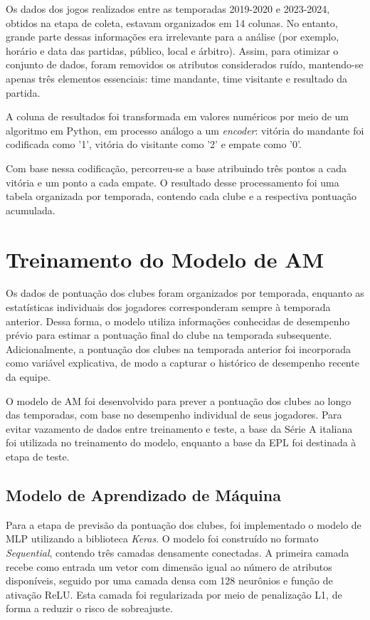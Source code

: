 Os dados dos jogos realizados entre as temporadas 2019-2020 e 2023-2024, obtidos na etapa de coleta, estavam organizados em 14 colunas. No entanto, 
grande parte dessas informações era irrelevante para a análise (por exemplo, horário e data das partidas, público, local e árbitro). 
Assim, para otimizar o conjunto de dados, foram removidos os atributos considerados ruído, mantendo-se apenas três elementos essenciais: time mandante, 
time visitante e resultado da partida.

A coluna de resultados foi transformada em valores numéricos por meio de um algoritmo em Python, em processo análogo a um \textit{encoder}: 
vitória do mandante foi codificada como '1', vitória do visitante como '2' e empate como '0'.

Com base nessa codificação, percorreu-se a base atribuindo três pontos a cada vitória e um ponto a cada empate. 
O resultado desse processamento foi uma tabela organizada por temporada, contendo cada clube e a respectiva pontuação acumulada.

\section{Treinamento do Modelo de AM}

Os dados de pontuação dos clubes foram organizados por temporada, enquanto as estatísticas individuais dos jogadores corresponderam sempre à temporada anterior. 
Dessa forma, o modelo utiliza informações conhecidas de desempenho prévio para estimar a pontuação final do clube na temporada subsequente. 
Adicionalmente, a pontuação dos clubes na temporada anterior foi incorporada como variável explicativa, de modo a capturar o histórico de desempenho recente da equipe.

O modelo de AM foi desenvolvido para prever a pontuação dos clubes ao longo das temporadas, com base no desempenho individual de seus jogadores. Para evitar 
vazamento de dados entre treinamento e teste, a base da Série A italiana foi utilizada no treinamento do modelo, enquanto a base da EPL foi destinada à etapa de teste.

\subsection{Modelo de Aprendizado de Máquina}

Para a etapa de previsão da pontuação dos clubes, foi implementado o modelo de MLP utilizando a biblioteca \textit{Keras}. O modelo foi construído 
no formato \textit{Sequential}, contendo três camadas densamente conectadas. A primeira camada recebe como entrada um vetor com dimensão igual ao 
número de atributos disponíveis, seguido por uma camada densa com 128 neurônios e função de ativação ReLU. Esta camada foi regularizada por meio de penalização L1, de 
forma a reduzir o risco de sobreajuste. 

